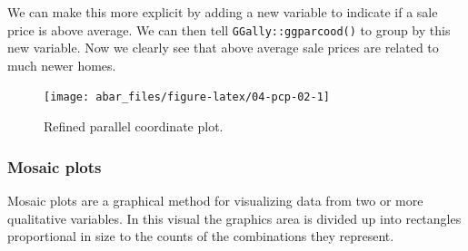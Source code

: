\documentclass[]{book}
\newenvironment{Shaded}{\begin{snugshade}}{\end{snugshade}}
\newcommand{\DataTypeTok}[1]{\textcolor[rgb]{0.13,0.29,0.53}{#1}}
\newcommand{\DecValTok}[1]{\textcolor[rgb]{0.00,0.00,0.81}{#1}}
\newcommand{\FloatTok}[1]{\textcolor[rgb]{0.00,0.00,0.81}{#1}}
\newcommand{\KeywordTok}[1]{\textcolor[rgb]{0.13,0.29,0.53}{\textbf{#1}}}
\newcommand{\NormalTok}[1]{#1}
\newcommand{\OperatorTok}[1]{\textcolor[rgb]{0.81,0.36,0.00}{\textbf{#1}}}
\newcommand{\StringTok}[1]{\textcolor[rgb]{0.31,0.60,0.02}{#1}}
\theoremstyle{definition}
\theoremstyle{definition}
\theoremstyle{definition}
\theoremstyle{remark}
\begin{document}
We can make this more explicit by adding a new variable to indicate if a
sale price is above average. We can then tell
\texttt{GGally::ggparcood()} to group by this new variable. Now we
clearly see that above average sale prices are related to much newer
homes.

\begin{Shaded}
\end{Shaded}

\begin{figure}

{\centering \texttt{[image: abar\_files/figure-latex/04-pcp-02-1]} 

}

\caption{Refined parallel coordinate plot.}\label{fig:04-pcp-02}
\end{figure}

\hypertarget{mosaic-plots}{%
\subsubsection{Mosaic plots}\label{mosaic-plots}}

Mosaic plots are a graphical method for visualizing data from two or
more qualitative variables. In this visual the graphics area is divided
up into rectangles proportional in size to the counts of the
combinations they represent.
\end{document}
